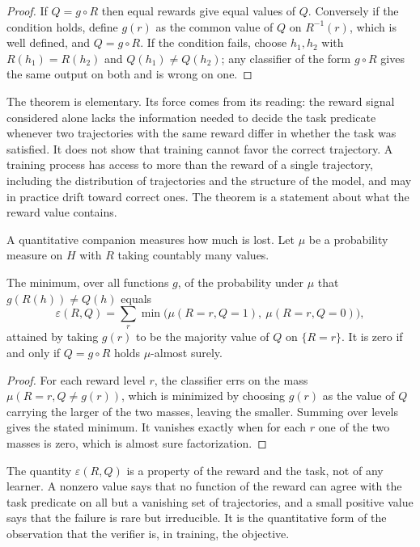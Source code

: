 \begin{proof}
If $Q = g \circ R$ then equal rewards give equal values of $Q$. Conversely if the condition holds, define $g(r)$ as the common value of $Q$ on $R^{-1}(r)$, which is well defined, and $Q = g \circ R$. If the condition fails, choose $h_1, h_2$ with $R(h_1) = R(h_2)$ and $Q(h_1) \ne Q(h_2)$; any classifier of the form $g \circ R$ gives the same output on both and is wrong on one.
\end{proof}

The theorem is elementary. Its force comes from its reading: the reward signal considered alone lacks the information needed to decide the task predicate whenever two trajectories with the same reward differ in whether the task was satisfied. It does not show that training cannot favor the correct trajectory. A training process has access to more than the reward of a single trajectory, including the distribution of trajectories and the structure of the model, and may in practice drift toward correct ones. The theorem is a statement about what the reward value contains.

A quantitative companion measures how much is lost. Let $\mu$ be a probability measure on $H$ with $R$ taking countably many values.

\begin{proposition}
\label{prop:bayes}
The minimum, over all functions $g$, of the probability under $\mu$ that $g(R(h)) \ne Q(h)$ equals
\[
\varepsilon(R, Q) = \sum_{r} \min\bigl( \mu(R = r, Q = 1),\ \mu(R = r, Q = 0) \bigr),
\]
attained by taking $g(r)$ to be the majority value of $Q$ on $\{R = r\}$. It is zero if and only if $Q = g \circ R$ holds $\mu$-almost surely.
\end{proposition}

\begin{proof}
For each reward level $r$, the classifier errs on the mass $\mu(R = r, Q \ne g(r))$, which is minimized by choosing $g(r)$ as the value of $Q$ carrying the larger of the two masses, leaving the smaller. Summing over levels gives the stated minimum. It vanishes exactly when for each $r$ one of the two masses is zero, which is almost sure factorization.
\end{proof}

The quantity $\varepsilon(R,Q)$ is a property of the reward and the task, not of any learner. A nonzero value says that no function of the reward can agree with the task predicate on all but a vanishing set of trajectories, and a small positive value says that the failure is rare but irreducible. It is the quantitative form of the observation that the verifier is, in training, the objective.

